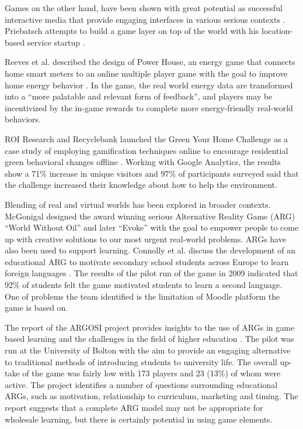 \documentclass{acm_proc_article-sp}
\begin{document}
Games on the other hand, have been shown with great potential as successful
interactive media that provide engaging interfaces in various serious contexts
\cite{mcgonigal2011reality,reeves2009total}. Priebatsch attempts to build a
game layer on top of the world with his location-based service startup
\cite{Priebatsch2010ted}.

Reeves et al. described the design of Power House, an energy game that connects
home smart meters to an online multiple player game with the goal to improve
home energy behavior \cite{Reeves2011powerhouse}. In the game, the real world
energy data are transformed into a ``more palatable and relevant form of
feedback'', and players may be incentivized by the in-game rewards to complete
more energy-friendly real-world behaviors.

ROI Research and Recyclebank launched the Green Your Home Challenge as a case 
study of employing gamification techniques online to 
encourage residential green behavioral changes offline \cite{gamingforgood}. 
Working with Google Analytics, the results show a 71\% increase in unique 
visitors and 97\% of participants surveyed said that the challenge increased 
their knowledge about how to help the environment. 

Blending of real and virtual worlds has been explored in broader contexts.
McGonigal designed the award winning serious Alternative Reality Game (ARG)
``World Without Oil'' \cite{worldwithoutoil} and later ``Evoke''
\cite{urgentevoke} with the goal to empower people to come up with creative
solutions to our most urgent real-world problems. ARGs have also been used to
support learning. Connolly et al. discuss the development of an educational ARG
to motivate secondary school students across Europe to learn foreign languages
\cite{connolly2009arguing}. The results of the pilot run of the game in 2009
indicated that 92\% of students felt the game motivated students to learn a
second language. One of problems the team identified is the limitation of
Moodle platform the game is based on.

The report of the ARGOSI project provides insights to the use of ARGs in game
based learning and the challenges in the field of higher education
\cite{whitton2009alternate}. The pilot was run at the University of Bolton with 
the aim to provide an engaging alternative to traditional methods of 
introducing students to university life. The overall up-take of the game was 
fairly low with 173 players and 23 (13\%) of whom were active. The project
identifies a number of questions surrounding educational ARGs, such as 
motivation, relationship to curriculum, marketing and timing. The report 
suggests that a complete ARG model may not be appropriate for wholesale
learning, but there is certainly potential in using game elements.
\end{document}
